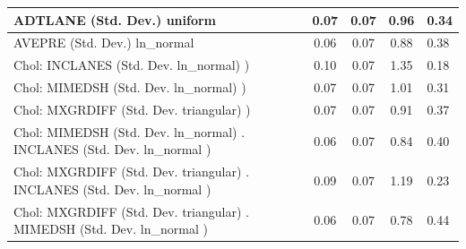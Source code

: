 \begin{table}
\begin{center}
\begin{tabular}{|l|l|c|c|c|l|}
			\hline
			ADTLANE (Std. Dev.) uniform &  & 0.07 & 0.07 & 0.96 & 0.34 \\
			\hline
			AVEPRE (Std. Dev.) ln_normal &  & 0.06 & 0.07 & 0.88 & 0.38 \\
			\hline
			 Chol: INCLANES (Std. Dev. ln_normal) ) &  & 0.10 & 0.07 & 1.35 & 0.18 \\
			\hline
			 Chol: MIMEDSH (Std. Dev. ln_normal) ) &  & 0.07 & 0.07 & 1.01 & 0.31 \\
			\hline
			 Chol: MXGRDIFF (Std. Dev. triangular) ) &  & 0.07 & 0.07 & 0.91 & 0.37 \\
			\hline
			 Chol: MIMEDSH (Std. Dev. ln_normal) . INCLANES (Std. Dev.   ln_normal ) &  & 0.06 & 0.07 & 0.84 & 0.40 \\
			\hline
			 Chol: MXGRDIFF (Std. Dev. triangular) . INCLANES (Std. Dev.   ln_normal ) &  & 0.09 & 0.07 & 1.19 & 0.23 \\
			\hline
			 Chol: MXGRDIFF (Std. Dev. triangular) . MIMEDSH (Std. Dev.   ln_normal ) &  & 0.06 & 0.07 & 0.78 & 0.44 \\
			\hline
		\end{tabular}
	\end{center}
\end{table}